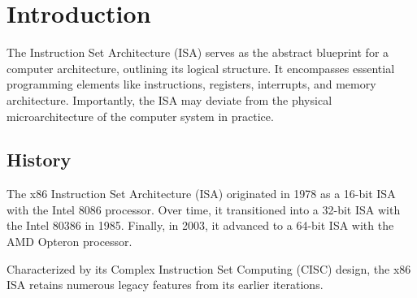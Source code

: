 \section{Introduction}

The Instruction Set Architecture (ISA) serves as the abstract blueprint for a computer architecture, outlining its logical structure. 
It encompasses essential programming elements like instructions, registers, interrupts, and memory architecture. 
Importantly, the ISA may deviate from the physical microarchitecture of the computer system in practice.

\subsection{History}
The x86 Instruction Set Architecture (ISA) originated in 1978 as a 16-bit ISA with the Intel 8086 processor. 
Over time, it transitioned into a 32-bit ISA with the Intel 80386 in 1985. 
Finally, in 2003, it advanced to a 64-bit ISA with the AMD Opteron processor.

Characterized by its Complex Instruction Set Computing (CISC) design, the x86 ISA retains numerous legacy features from its earlier iterations.

